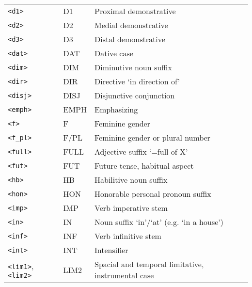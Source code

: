 \begin{table}[!h]
\begin{center}
\begin{tabular}{|p{4cm}|p{3cm}|p{8.5cm}|}
            \texttt{<d1>} & D1 & Proximal demonstrative\\
            \texttt{<d2>} & D2 & Medial demonstrative\\
            \texttt{<d3>} & D3 & Distal demonstrative\\
            \texttt{<dat>} & DAT & Dative case\\
            \texttt{<dim>} & DIM & Diminutive noun suffix\\
            \texttt{<dir>} & DIR & Directive `in direction of'\\
            \texttt{<disj>} & DISJ & Disjunctive conjunction\\
            \texttt{<emph>} & EMPH & Emphasizing\\
            \texttt{<f>} & F & Feminine gender\\
            \texttt{<f\_pl>} & F/PL & Feminine gender or plural number\\
            \texttt{<full>} & FULL & Adjective suffix `=full of X'\\
            \texttt{<fut>} & FUT & Future tense, habitual aspect\\
            \texttt{<hb>} & HB & Habilitive noun suffix\\
            \texttt{<hon>} & HON & Honorable personal pronoun suffix\\
            \texttt{<imp>} & IMP & Verb imperative stem\\
            \texttt{<in>} & IN & Noun suffix `in'/`at' (e.g. `in a house')\\
            \texttt{<inf>} & INF & Verb infinitive stem\\
            \texttt{<int>} & INT & Intensifier\\
            \texttt{<lim1>}, \texttt{<lim2>} & LIM2 & Spacial and temporal limitative, instrumental case\\
            \hline
        \end{tabular}
    \end{center}
\end{table}

